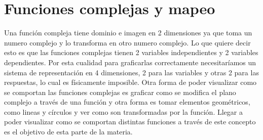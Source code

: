 \chapter{Funciones complejas y mapeo}

Una función compleja tiene dominio e imagen en 2 dimensiones ya que toma un numero complejo y lo transforma en otro numero complejo. Lo que quiere decir esto es que las funciones complejas tienen 2 variables independientes y 2 variables dependientes. Por esta cualidad para graficarlas correctamente necesitaríamos un sistema de representación en 4 dimensiones, 2 para las variables y otras 2 para las respuestas, lo cual es físicamente imposible. Otra forma de poder visualizar como se comportan las funciones complejas es graficar como se modifica el plano complejo a través de una función y otra forma es tomar elementos geométricos, como lineas y círculos y ver como son transformadas por la función. Llegar a poder visualizar como se comportan distintas funciones a través de este concepto es el objetivo de esta parte de la materia.

